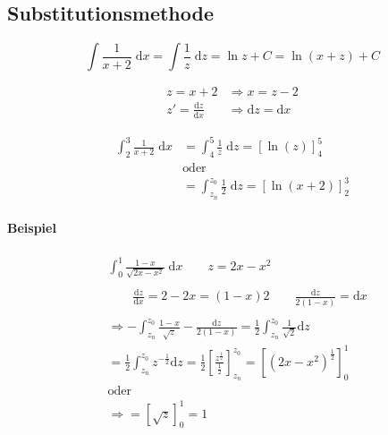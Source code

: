 \subsection{Substitutionsmethode}

\[
    \int \frac{1}{x+2} \;\mathrm{d}x = \int \frac{1}{z} \;\mathrm{d}z = \ln z + C = \ln (x+z) + C
\]

\begin{align*}
    z = x + 2 &\Rightarrow x = z - 2 \\
    z' = \frac{\mathrm{d}z}{\mathrm{d}x} &\Rightarrow \mathrm{d}z = \mathrm{d}x
\end{align*}

\begin{align*}
    \int_2^3 \frac{1}{x+2} \;\mathrm{d}x &= \int_4^5 \frac{1}{z} \;\mathrm{d}z = {[\ln(z)]}_4^5 \\
    &\text{oder} \\
    &= \int_{z_n}^{z_0} \frac{1}{2} \;\mathrm{d}z = {[\ln(x+2)]}_2^3
\end{align*}

\paragraph{Beispiel}


\begin{align*}
    &\int_0^1 \frac{1-x}{\sqrt{2x-x^2}} \;\mathrm{d}x
    \qquad z = 2x - x^2 \\
    \\
    &\qquad \frac{\mathrm{d}z}{\mathrm{d}x} = 2 - 2x = (1-x)2
    \qquad \frac{\mathrm{d}z}{2(1-x)} = \mathrm{d}x \\
    \\
    &\Rightarrow - \int_{z_n}^{z_0} \frac{1-x}{\sqrt{z}} - \frac{\mathrm{d}z}{2(1-x)}
    = \frac{1}{2} \int_{z_n}^{z_0} \frac{1}{\sqrt{2}} \mathrm{d}z \\
    &= \frac{1}{2} \int_{z_n}^{z_0} z^{-\frac{1}{2}} \mathrm{d}z 
    = \frac{1}{2} {\left[ \frac{z^{\frac{1}{2}}}{\frac{1}{2}} \right]}_{z_n}^{z_0}
    = {\left[ {\left( 2x-x^2 \right)}^\frac{1}{2} \right]}_0^1 \\
    &\text{oder} \\
    &\Rightarrow = {\left[ \sqrt{z} \right]}_0^1 = 1
\end{align*}
